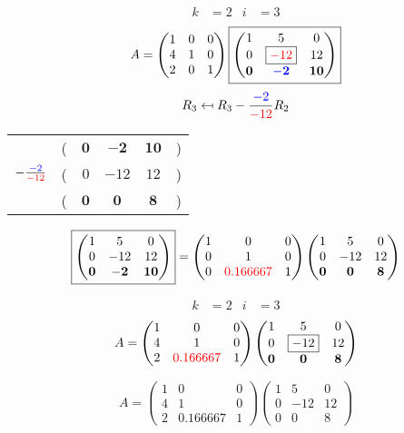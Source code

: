 \documentclass[pdf]{beamer}
\begin{document}
\begin{frame}{}\begin{align*} k &= 2 & i &= 3 \end{align*} $$A=\begin{pmatrix}1&0&0\\4&1&0\\2&0&1\end{pmatrix} \boxed{\begin{pmatrix}1&5&0\\0&\boxed{{\color{red}-12}}&12\\\mathbf{0}&\mathbf{{\color{blue}-2}}&\mathbf{10}\end{pmatrix}} $$ $$R_3 \mapsfrom R_3 - \frac{{\color{blue}-2}}{{\color{red}-12}} R_2$$ \begin{center}\begin{tabular}{cccccc}  &(& $ \mathbf{0} $ & $ \mathbf{-2} $ & $ \mathbf{10} $ &)\\$ -\frac{{\color{blue}-2}}{{\color{red}-12}} $&(& $ 0 $ & $ -12 $ & $ 12 $ &)\\\hline  &(& $ \mathbf{0} $ & $ \mathbf{0} $ & $ \mathbf{8} $ &) \end{tabular}\end{center} $$ \boxed{\begin{pmatrix}1&5&0\\0&-12&12\\\mathbf{0}&\mathbf{-2}&\mathbf{10}\end{pmatrix}} = \begin{pmatrix}1&0&0\\0&1&0\\0&{\color{red}0.166667}&1\end{pmatrix} \begin{pmatrix}1&5&0\\0&-12&12\\\mathbf{0}&\mathbf{0}&\mathbf{8}\end{pmatrix} $$\end{frame}
\begin{frame}{}\begin{align*} k &= 2 & i &= 3 \end{align*}$$A=\begin{pmatrix}1&0&0\\4&1&0\\2&{\color{red}0.166667}&1\end{pmatrix} \begin{pmatrix}1&5&0\\0&\boxed{-12}&12\\\mathbf{0}&\mathbf{0}&\mathbf{8}\end{pmatrix} $$\end{frame}
\begin{frame}{}$$A=\begin{pmatrix}1&0&0\\4&1&0\\2&0.166667&1\end{pmatrix} \begin{pmatrix}1&5&0\\0&-12&12\\0&0&8\end{pmatrix}$$
\end{frame}
\end{document}
